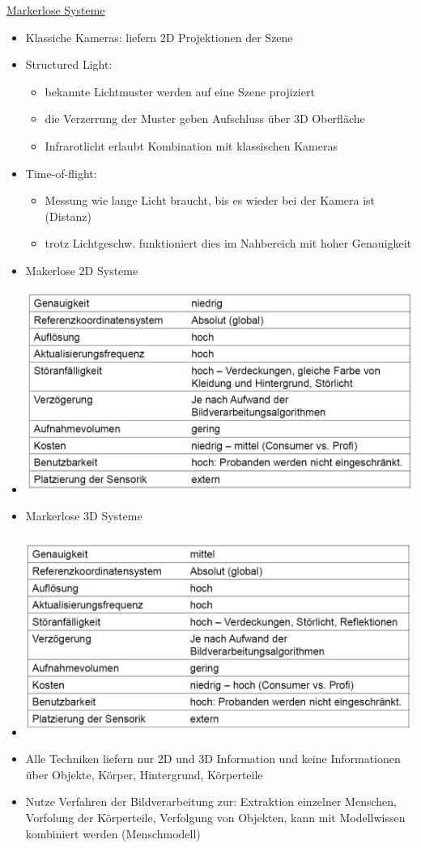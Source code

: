 \documentclass[a4paper,10pt,oneside]{article}
\begin{document}
\underline{Markerlose Systeme} \\
	\begin{itemize}
		\item Klassiche Kameras: liefern 2D Projektionen der Szene
		\item Structured Light:	
			\begin{itemize}
				\item bekannte Lichtmuster werden auf eine Szene projiziert
				\item die Verzerrung der Muster geben Aufschluss über 3D Oberfläche
				\item Infrarotlicht erlaubt Kombination mit klassischen Kameras
			\end{itemize}
		\item Time-of-flight:
			\begin{itemize}
				\item Messung wie lange Licht braucht, bis es wieder bei der Kamera ist (Distanz)
				\item trotz Lichtgeschw. funktioniert dies im Nahbereich mit hoher Genauigkeit
			\end{itemize}
		\item Makerlose 2D Systeme
		\item[] \includegraphics[scale=0.2]{Grafiken/2235.png}
		\item Markerlose 3D Systeme
		\item[] \includegraphics[scale=0.2]{Grafiken/2233.png}
		\item Alle Techniken liefern nur 2D und 3D Information und keine Informationen über Objekte, Körper, Hintergrund, Körperteile
		\item Nutze Verfahren der Bildverarbeitung zur: Extraktion einzelner Menschen, Vorfolung der Körperteile, Verfolgung von Objekten, kann mit Modellwissen kombiniert werden (Menschmodell)
	\end{itemize}
	
\end{document}
